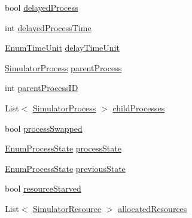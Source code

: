 \begin{DoxyCompactItemize}
\item 
bool \hyperlink{struct_c_p_u___o_s___simulator_1_1_operating___system_1_1_process_flags_ac6a4a5a7465da7e567a655cae4dd1aa4}{delayed\+Process}
\item 
int \hyperlink{struct_c_p_u___o_s___simulator_1_1_operating___system_1_1_process_flags_a9b9ff1ea252f64035813f0f478d705ae}{delayed\+Process\+Time}
\item 
\hyperlink{namespace_c_p_u___o_s___simulator_1_1_operating___system_a0553d0bc2513aec52caa769acf994d5c}{Enum\+Time\+Unit} \hyperlink{struct_c_p_u___o_s___simulator_1_1_operating___system_1_1_process_flags_a0e5e535ff000e1b630180443c2295776}{delay\+Time\+Unit}
\item 
\hyperlink{class_c_p_u___o_s___simulator_1_1_operating___system_1_1_simulator_process}{Simulator\+Process} \hyperlink{struct_c_p_u___o_s___simulator_1_1_operating___system_1_1_process_flags_a6b32c9b5ed4914dede86c2a1306c897e}{parent\+Process}
\item 
int \hyperlink{struct_c_p_u___o_s___simulator_1_1_operating___system_1_1_process_flags_a115209ffd287aaba9aa6b1bf9ba7a968}{parent\+Process\+I\+D}
\item 
List$<$ \hyperlink{class_c_p_u___o_s___simulator_1_1_operating___system_1_1_simulator_process}{Simulator\+Process} $>$ \hyperlink{struct_c_p_u___o_s___simulator_1_1_operating___system_1_1_process_flags_aae4b90a688d3ac4e6d3faea6cb275242}{child\+Processes}
\item 
bool \hyperlink{struct_c_p_u___o_s___simulator_1_1_operating___system_1_1_process_flags_aa57e25afb816fa9a0e11c43920640992}{process\+Swapped}
\item 
\hyperlink{namespace_c_p_u___o_s___simulator_1_1_operating___system_a836ee2204e78fcb3a7dd6c3c942b1a24}{Enum\+Process\+State} \hyperlink{struct_c_p_u___o_s___simulator_1_1_operating___system_1_1_process_flags_ac5d7a47d263eb80357b0a7900858bd98}{process\+State}
\item 
\hyperlink{namespace_c_p_u___o_s___simulator_1_1_operating___system_a836ee2204e78fcb3a7dd6c3c942b1a24}{Enum\+Process\+State} \hyperlink{struct_c_p_u___o_s___simulator_1_1_operating___system_1_1_process_flags_a89cd3299d16c593e82819dfeb40749a1}{previous\+State}
\item 
bool \hyperlink{struct_c_p_u___o_s___simulator_1_1_operating___system_1_1_process_flags_abc77938558baa106a799492596c9178b}{resource\+Starved}
\item 
List$<$ \hyperlink{class_c_p_u___o_s___simulator_1_1_operating___system_1_1_simulator_resource}{Simulator\+Resource} $>$ \hyperlink{struct_c_p_u___o_s___simulator_1_1_operating___system_1_1_process_flags_aeeb2a90f98ea93e6ee4c9d092fb0573d}{allocated\+Resources}

\end{DoxyCompactItemize}
